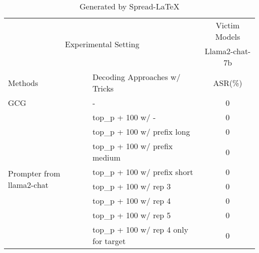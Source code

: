 \begin{table}[H]\centering
\caption{Generated by Spread-LaTeX}\label{tab: }
\scriptsize
\begin{tabular}{llc}\toprule
\multicolumn{2}{c}{\multirow{2}{*}{Experimental Setting}} &\multicolumn{1}{c}{Victim Models} \\
\cmidrule{3-3}
& & Llama2-chat-7b\\
\midrule
Methods & Decoding Approaches w/ Tricks  & ASR(\%)\\
\midrule
GCG & - & 0 \\ %
\cmidrule{1-3} %
\multirow{8}{*}{Prompter from llama2-chat} &top\_p + 100 w/ - &0 \\
&top\_p + 100 w/ prefix long &0 \\
&top\_p + 100 w/ prefix medium &0 \\
&top\_p + 100 w/ prefix short &0 \\
&top\_p + 100 w/ rep 3 &0 \\
&top\_p + 100 w/ rep 4 &0 \\
&top\_p + 100 w/ rep 5 &0 \\
&top\_p + 100 w/ rep 4 only for target &0 \\
\bottomrule
\end{tabular}
\end{table}
